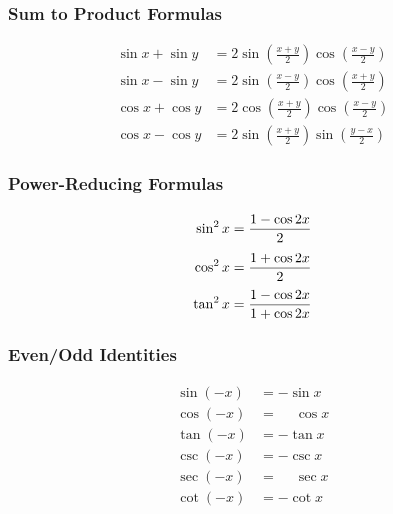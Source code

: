 \noindent%
\begin{minipage}[t]{.44\linewidth}
\subsubsection*{Sum to Product Formulas}
\begin{align*}
\sin x+\sin y &= 2\sin \left(\frac{x+y}2\right)\cos\left(\frac{x-y}2\right) &~\\
\sin x-\sin y &= 2\sin \left(\frac{x-y}2\right)\cos\left(\frac{x+y}2\right) \\
\cos x+\cos y &= 2\cos \left(\frac{x+y}2\right)\cos\left(\frac{x-y}2\right) \\
\cos x-\cos y &= 2\sin \left(\frac{x+y}2\right)\sin\left(\frac{y-x}2\right)
\end{align*}
\end{minipage}%
\begin{minipage}[t]{.3\linewidth}
\subsubsection*{Power-Reducing Formulas}
\begin{align*}
\sin^2 x &= \frac{1-\cos 2x}{2} & \vphantom{\left(\frac11\right)}\\
\cos^2 x &= \frac{1+\cos 2x}{2} & \vphantom{\left(\frac11\right)}\\
\tan^2 x &= \frac{1-\cos 2x}{1+\cos 2x}
\end{align*}
\end{minipage}%
\begin{minipage}[t]{.25\linewidth}
\subsubsection*{Even/Odd Identities}
\begin{align*}
\sin(-x) &= -\sin x &~\\
\cos(-x) &= \phantom{-}\cos x \\
\tan(-x) &= -\tan x \\
\csc(-x) &= -\csc x \\
\sec(-x) &= \phantom{-}\sec x \\
\cot(-x) &= -\cot x
\end{align*}
\end{minipage}

\bigskip

